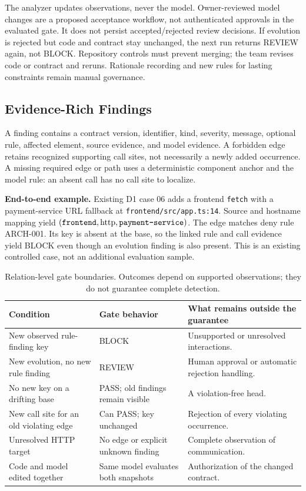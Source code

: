 The analyzer updates observations, never the model. Owner-reviewed model changes are a proposed acceptance workflow, not authenticated approvals in the evaluated gate. It does not persist accepted/rejected review decisions. If evolution is rejected but code and contract stay unchanged, the next run returns REVIEW again, not BLOCK. Repository controls must prevent merging; the team revises code or contract and reruns. Rationale recording and new rules for lasting constraints remain manual governance.

\subsection{Evidence-Rich Findings}

A finding contains a contract version, identifier, kind, severity, message, optional rule, affected element, source evidence, and model evidence. A forbidden edge retains recognized supporting call sites, not necessarily a newly added occurrence. A missing required edge or path uses a deterministic component anchor and the model rule: an absent call has no call site to localize.

\textbf{End-to-end example.} Existing D1 case 06 adds a frontend \texttt{fetch} with a payment-service URL fallback at \texttt{frontend/src/app.ts:14}. Source and hostname mapping yield $(\texttt{frontend},\mathrm{http},\texttt{payment\mbox{-}service})$. The edge matches deny rule ARCH-001. Its key is absent at the base, so the linked rule and call evidence yield BLOCK even though an evolution finding is also present. This is an existing controlled case, not an additional evaluation sample.

\begin{table}[t]
\centering\small
\caption{Relation-level gate boundaries. Outcomes depend on supported observations; they do not guarantee complete detection.}
\label{tab:policy-boundaries}
\begin{tabular}{p{}p{}p{}}
\toprule
Condition & Gate behavior & What remains outside the guarantee \\
\midrule
New observed rule-finding key & BLOCK & Unsupported or unresolved interactions. \\
New evolution, no new rule finding & REVIEW & Human approval or automatic rejection handling. \\
No new key on a drifting base & PASS; old findings remain visible & A violation-free head. \\
New call site for an old violating edge & Can PASS; key unchanged & Rejection of every violating occurrence. \\
Unresolved HTTP target & No edge or explicit unknown finding & Complete observation of communication. \\
Code and model edited together & Same model evaluates both snapshots & Authorization of the changed contract. \\
\bottomrule
\end{tabular}
\end{table}
